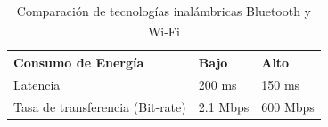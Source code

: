 \begin{table}[h]
\begin{tabularx}{\textwidth}{|X|X|X|}
        Consumo de Energía & Bajo & Alto \\ \hline
                     
        Latencia & 200 ms & 150 ms \\ \hline
                     
        Tasa de transferencia (Bit-rate) & 2.1 Mbps & 600 Mbps\\ \hline
            
    \end{tabularx}
    
    \caption{Comparación de tecnologías inalámbricas Bluetooth\textsuperscript{\textregistered} y Wi-Fi\textsuperscript{\textregistered}}
    \label{tab:ComparacionInterfaz}
\end{table}

